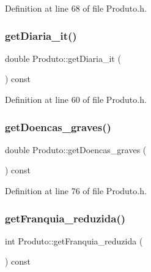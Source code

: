 Definition at line 68 of file Produto.\+h.

\hypertarget{class_produto_a85b9599abec0fb97bfe8f2b42dca1faf}{}\label{class_produto_a85b9599abec0fb97bfe8f2b42dca1faf} 
\subsubsection{\texorpdfstring{get\+Diaria\+\_\+it()}{getDiaria\_it()}}
{\footnotesize\ttfamily double Produto\+::get\+Diaria\+\_\+it (\begin{DoxyParamCaption}{ }\end{DoxyParamCaption}) const\hspace{0.3cm}{\ttfamily [inline]}}



Definition at line 60 of file Produto.\+h.

\hypertarget{class_produto_a6f63e718b470563a0f3c4093b59a6eb9}{}\label{class_produto_a6f63e718b470563a0f3c4093b59a6eb9} 
\subsubsection{\texorpdfstring{get\+Doencas\+\_\+graves()}{getDoencas\_graves()}}
{\footnotesize\ttfamily double Produto\+::get\+Doencas\+\_\+graves (\begin{DoxyParamCaption}{ }\end{DoxyParamCaption}) const\hspace{0.3cm}{\ttfamily [inline]}}



Definition at line 76 of file Produto.\+h.

\hypertarget{class_produto_a3159458124c68ace89e583f97f6039c8}{}\label{class_produto_a3159458124c68ace89e583f97f6039c8} 
\subsubsection{\texorpdfstring{get\+Franquia\+\_\+reduzida()}{getFranquia\_reduzida()}}
{\footnotesize\ttfamily int Produto\+::get\+Franquia\+\_\+reduzida (\begin{DoxyParamCaption}{ }\end{DoxyParamCaption}) const\hspace{0.3cm}{\ttfamily [inline]}}



